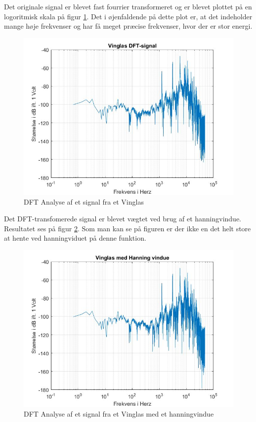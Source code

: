 Det originale signal er blevet fast fourrier transformeret og er blevet plottet på en logoritmisk skala på figur \ref{fig:Vinglas DFT}. Det i øjenfaldende på dette plot er, at det indeholder mange høje frekvenser og har få meget præcise frekvenser, hvor der er stor energi.

\begin{figure}[H]
	\centering
	\includegraphics[width=140mm]{figures/Vinglas/DFT.jpg}
	\caption{DFT Analyse af et signal fra et Vinglas}
	\label{fig:Vinglas DFT}
\end{figure}

Det DFT-transfomerede signal er blevet vægtet ved brug af et hanningvindue. Resultatet ses på figur \ref{fig:Vinglas hanning}. Som man kan se på figuren er der ikke en det helt store at hente ved hanningviduet på denne funktion.
\begin{figure}[H]
	\centering
	\includegraphics[width=140mm]{figures/Vinglas/hanning.jpg}
	\caption{DFT Analyse af et signal fra et Vinglas med et hanningvindue}
	\label{fig:Vinglas hanning}
\end{figure}



